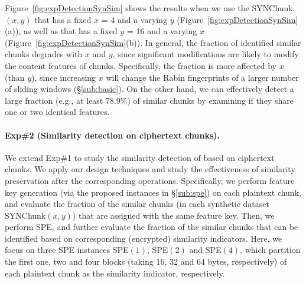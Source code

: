 Figure~\ref{fig:expDetectionSynSim} shows the results when we use the SYNChunk$(x, y)$ that has a fixed $x$ = 4 and a varying $y$ (Figure~\ref{fig:expDetectionSynSim}(a)), as well as that has a fixed $y$ = 16 and a varying $x$ (Figure~\ref{fig:expDetectionSynSim}(b)). In general, the fraction of identified similar chunks degrades with $x$ and $y$, since significant modifications are likely to modify the content features of chunks. Specifically, the fraction is more affected by $x$ (than $y$), since increasing $x$ will change the Rabin fingerprints of a larger number of sliding windows (\S\ref{sub:basic}). On the other hand, we can effectively detect a large fraction (e.g., at least 78.9\%) of similar chunks by examining if they share one or two identical features.



\paragraph{Exp\#2 (Similarity detection on ciphertext chunks).}
We extend Exp\#1 to study the similarity detection of \sysnameF based on ciphertext chunks. We apply our design techniques and study the effectiveness of similarity preservation after the corresponding operations. Specifically, we perform feature key generation (via the proposed instances in \S\ref{sub:spe}) on each plaintext chunk, and evaluate the fraction of the similar chunks (in each synthetic dataset SYNChunk$(x, y)$) that are assigned with the same feature key. Then, we perform SPE, and further evaluate the fraction of the similar chunks that can be identified based on corresponding (encrypted) similarity indicators. Here, we focus on three SPE instances SPE$(1)$, SPE$(2)$ and SPE$(4)$, which partition the first one, two and four blocks (taking 16, 32 and 64 bytes, respectively) of each plaintext chunk as the similarity indicator, respectively.

